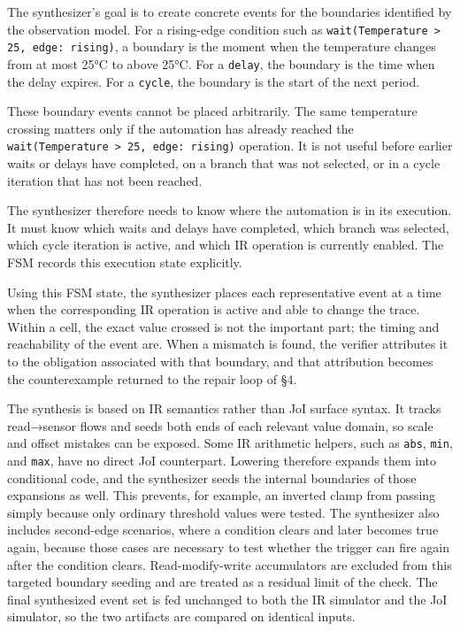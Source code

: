 \documentclass[sigconf,nonacm,anonymous,review]{acmart}
\begin{document}
The synthesizer's goal is to create concrete events for the boundaries identified by the observation model. For a rising-edge condition such as \texttt{wait(Temperature > 25, edge: rising)}, a boundary is the moment when the temperature changes from at most 25°C to above 25°C. For a \texttt{delay}, the boundary is the time when the delay expires. For a \texttt{cycle}, the boundary is the start of the next period.

These boundary events cannot be placed arbitrarily. The same temperature crossing matters only if the automation has already reached the \texttt{wait(Temperature > 25, edge: rising)} operation. It is not useful before earlier waits or delays have completed, on a branch that was not selected, or in a cycle iteration that has not been reached.

The synthesizer therefore needs to know where the automation is in its execution. It must know which waits and delays have completed, which branch was selected, which cycle iteration is active, and which IR operation is currently enabled. The FSM records this execution state explicitly.

Using this FSM state, the synthesizer places each representative event at a time when the corresponding IR operation is active and able to change the trace. Within a cell, the exact value crossed is not the important part; the timing and reachability of the event are. When a mismatch is found, the verifier attributes it to the obligation associated with that boundary, and that attribution becomes the counterexample returned to the repair loop of \S4.

The synthesis is based on IR semantics rather than JoI surface syntax. It tracks read→sensor flows and seeds both ends of each relevant value domain, so scale and offset mistakes can be exposed. Some IR arithmetic helpers, such as \texttt{abs}, \texttt{min}, and \texttt{max}, have no direct JoI counterpart. Lowering therefore expands them into conditional code, and the synthesizer seeds the internal boundaries of those expansions as well. This prevents, for example, an inverted clamp from passing simply because only ordinary threshold values were tested. The synthesizer also includes second-edge scenarios, where a condition clears and later becomes true again, because those cases are necessary to test whether the trigger can fire again after the condition clears. Read-modify-write accumulators are excluded from this targeted boundary seeding and are treated as a residual limit of the check. The final synthesized event set is fed unchanged to both the IR simulator and the JoI simulator, so the two artifacts are compared on identical inputs.
\end{document}
